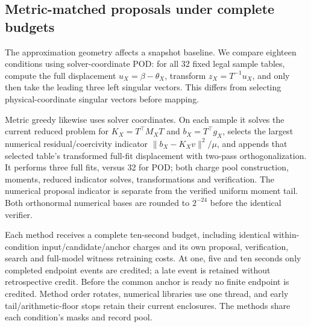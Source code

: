 \subsection{Metric-matched proposals under complete budgets}\label{app:metric-v79}
The approximation geometry affects a snapshot baseline. We compare eighteen conditions using solver-coordinate POD: for all 32 fixed legal sample tables, compute the full displacement $u_X=\beta-\theta_X$, transform $z_X=T^{-1}u_X$, and only then take the leading three left singular vectors. This differs from selecting physical-coordinate singular vectors before mapping.

Metric greedy likewise uses solver coordinates. On each sample it solves the current reduced problem for $K_X=T^\top M_XT$ and $b_X=T^\top g_X$, selects the largest numerical residual/coercivity indicator $\|b_X-K_Xv\|^2/\mu$, and appends that selected table's transformed full-fit displacement with two-pass orthogonalization. It performs three full fits, versus 32 for POD; both charge pool construction, moments, reduced indicator solves, transformations and verification. The numerical proposal indicator is separate from the verified uniform moment tail. Both orthonormal numerical bases are rounded to $2^{-24}$ before the identical verifier.

Each method receives a complete ten-second budget, including identical within-condition input/candidate/anchor charges and its own proposal, verification, search and full-model witness retraining costs. At one, five and ten seconds only completed endpoint events are credited; a late event is retained without retrospective credit. Before the common anchor is ready no finite endpoint is credited. Method order rotates, numerical libraries use one thread, and early tail/arithmetic-floor stops retain their current enclosures. The methods share each condition's masks and record pool.

